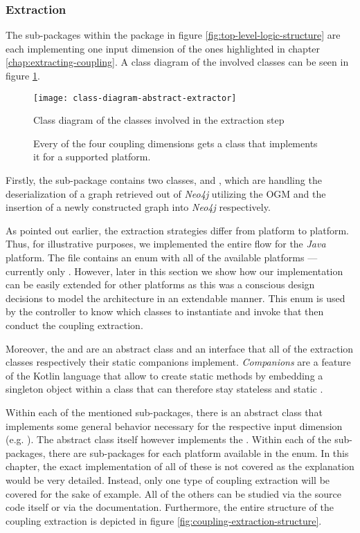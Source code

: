 \documentclass[12pt,a4paper]{report}
\begin{document}
\subsubsection{Extraction}
The sub-packages within the package  in figure
\ref{fig:top-level-logic-structure} are each implementing one input dimension of the
ones highlighted in chapter \ref{chap:extracting-coupling}.
A class diagram of the involved classes can be seen in figure
\ref{fig:class-diagram-abstract-extractor}.

\begin{figure}[htbp]
\centering
\texttt{[image: class-diagram-abstract-extractor]}
\caption{Class diagram of the classes involved in the extraction step}
\caption*{\centering
  Every of the four coupling dimensions gets a class that implements it
  for a supported platform.
}
\label{fig:class-diagram-abstract-extractor}
\end{figure}

Firstly, the sub-package  contains two classes,
 and , which are handling the deserialization
of a graph retrieved out of \textit{Neo4j} utilizing the OGM and the insertion of
a newly constructed graph into \textit{Neo4j} respectively.

As pointed out earlier, the extraction strategies differ from platform to platform.
Thus, for illustrative purposes, we implemented the entire flow for the \textit{Java}
platform. The  file contains an enum with all of the available
platforms --- currently only . However, later in this section we show
how our implementation can be easily extended for other platforms as this was a
conscious design decisions to model the architecture in an extendable manner.
This enum is used by the controller to know which classes to instantiate and invoke
that then conduct the coupling extraction.

Moreover, the  and  are an abstract
class and an interface that all of the extraction classes respectively their
static companions implement. \textit{Companions} are a feature of the Kotlin language
that allow to create static methods by embedding a singleton object within a class
that can therefore stay stateless and static \cite{kotlin-companions}.

Within each of the mentioned sub-packages, there is an abstract class that implements
some general behavior necessary for the respective input dimension
(e.g. ). The abstract class itself however
implements the .
Within each of the sub-packages, there are sub-packages for each platform available
in the  enum.
In this chapter, the exact implementation of all of these is not covered as the
explanation would be very detailed. Instead, only one type of coupling extraction
will be covered for the sake of example. All of the others can be studied via the
source code itself or via the documentation.
Furthermore, the entire structure of the coupling extraction is depicted in figure
\ref{fig:coupling-extraction-structure}.
\end{document}
